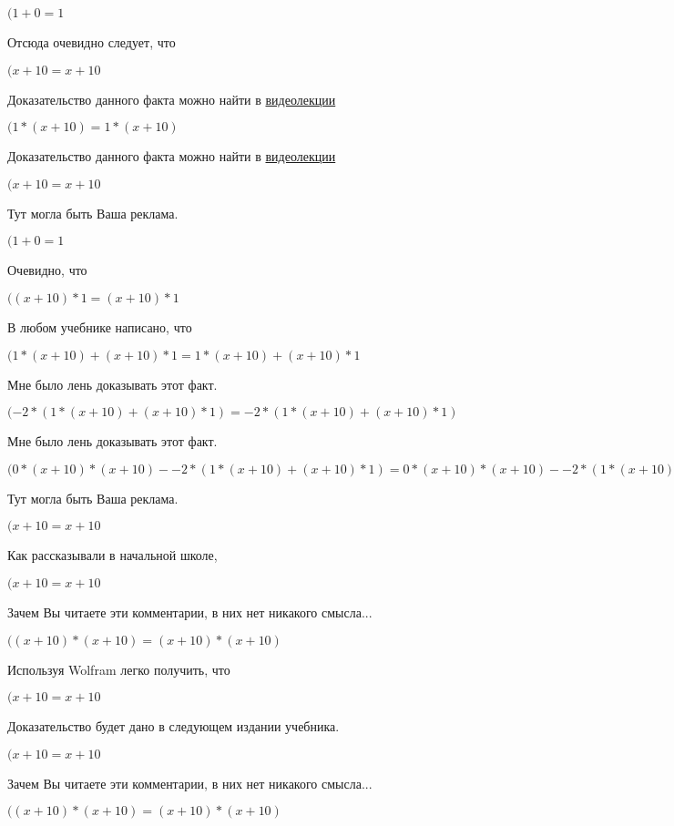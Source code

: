 \documentclass[12pt,a4paper,fleqn]{article}
\theoremstyle{definition}
\begin{document}
$( 1  +  0  =  1 $

Отсюда очевидно следует, что

$( x  +  10  =  x  +  10 $

Доказательство данного факта можно найти в \href{https://www.youtube.com/watch?v=dQw4w9WgXcQ}{видеолекции}

$( 1  * ( x  +  10 ) =  1  * ( x  +  10 )$

Доказательство данного факта можно найти в \href{https://www.youtube.com/watch?v=dQw4w9WgXcQ}{видеолекции}

$( x  +  10  =  x  +  10 $

Тут могла быть Ваша реклама.

$( 1  +  0  =  1 $

Очевидно, что

$(( x  +  10 ) *  1  = ( x  +  10 ) *  1 $

В любом учебнике написано, что

$( 1  * ( x  +  10 ) + ( x  +  10 ) *  1  =  1  * ( x  +  10 ) + ( x  +  10 ) *  1 $

Мне было лень доказывать этот факт.

$( -2  * ( 1  * ( x  +  10 ) + ( x  +  10 ) *  1 ) =  -2  * ( 1  * ( x  +  10 ) + ( x  +  10 ) *  1 )$

Мне было лень доказывать этот факт.

$( 0  * ( x  +  10 ) * ( x  +  10 ) -  -2  * ( 1  * ( x  +  10 ) + ( x  +  10 ) *  1 ) =  0  * ( x  +  10 ) * ( x  +  10 ) -  -2  * ( 1  * ( x  +  10 ) + ( x  +  10 ) *  1 )$

Тут могла быть Ваша реклама.

$( x  +  10  =  x  +  10 $

Как рассказывали в начальной школе,

$( x  +  10  =  x  +  10 $

Зачем Вы читаете эти комментарии, в них нет никакого смысла...

$(( x  +  10 ) * ( x  +  10 ) = ( x  +  10 ) * ( x  +  10 )$

Используя Wolfram легко получить, что

$( x  +  10  =  x  +  10 $

Доказательство будет дано в следующем издании учебника.

$( x  +  10  =  x  +  10 $

Зачем Вы читаете эти комментарии, в них нет никакого смысла...

$(( x  +  10 ) * ( x  +  10 ) = ( x  +  10 ) * ( x  +  10 )$
\end{document}
